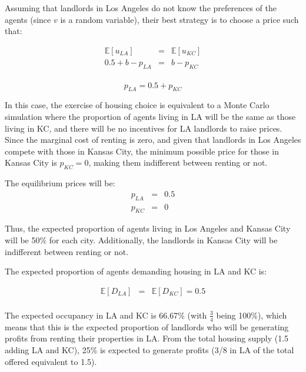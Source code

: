 Assuming that landlords in Los Angeles do not know the preferences of the agents (since \( v \) is a random variable), their best strategy is to choose a price such that:

\begin{eqnarray*}
    \mathbb{E}[u_{LA}] &=& \mathbb{E}[u_{KC}]\\
    0.5 + b - p_{LA} &=& b - p_{KC}\\
\end{eqnarray*}

\begin{equation}
    p_{LA} = 0.5 + p_{KC}
    \label{eq:equilibrium}
\end{equation}

In this case, the exercise of housing choice is equivalent to a Monte Carlo simulation where the proportion of agents living in LA will be the same as those living in KC, and there will be no incentives for LA landlords to raise prices.\\

Since the marginal cost of renting is zero, and given that landlords in Los Angeles compete with those in Kansas City, the minimum possible price for those in Kansas City is \( p_{KC} = 0 \), making them indifferent between renting or not.


\begin{myanswerbox}
    The equilibrium prices will be:
    \begin{eqnarray*}
        p_{LA} &=& 0.5\\
        p_{KC} &=& 0
    \end{eqnarray*}

    Thus, the expected proportion of agents living in Los Angeles and Kansas City will be 50\% for each city. Additionally, the landlords in Kansas City will be indifferent between renting or not.\\
\end{myanswerbox}

The expected proportion of agents demanding housing in LA and KC is: 

\begin{eqnarray*}
    \mathbb{E}[D_{LA}] &=& \mathbb{E}[D_{KC}] = 0.5\\
\end{eqnarray*}
    
The expected occupancy in LA and KC is 66.67\% (with \( \frac{3}{4} \) being 100\%), which means that this is the expected proportion of landlords who will be generating profits from renting their properties in LA. From the total housing supply (1.5 adding LA and KC), 25\% is expected to generate profits (3/8 in LA of the total offered equivalent to 1.5). \\


